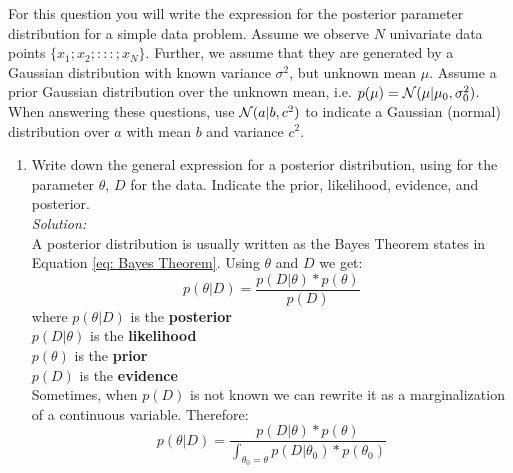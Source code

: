 \documentclass{../amsml}
\begin{document}

\begin{problem} %
For this question you will write the expression for the posterior parameter distribution for a simple data problem. Assume we observe $N$ univariate data points $\{x_1; x_2; : : : ; x_N\}$. Further, we assume that they are generated by a Gaussian distribution with known variance $\sigma^2$, but unknown mean $\mu$. Assume a prior Gaussian distribution over the unknown mean, i.e. $p(\mu) = \mathcal{N}(\mu | \mu_0 , \sigma_0^2)$. When answering these questions, use $\mathcal{N}(a | b, c^2)$ to indicate a Gaussian (normal) distribution over $a$ with mean $b$ and variance $c^2$.

\begin{enumerate}
	\item Write down the general expression for a posterior distribution, using  for the parameter $\theta$, $D$ for the data. Indicate the prior, likelihood, evidence, and posterior. \\
		\emph{Solution: }  \\
			A posterior distribution is usually written as the Bayes Theorem states in Equation \ref{eq: Bayes Theorem}. Using $\theta$ and $D$ we get:
			\begin{equation} \label{eq: posteriorDist}
			p( \theta | D ) = \frac{p( D | \theta ) * p( \theta)}{p(D)}
			\end{equation}
			where 
				$p( \theta | D )$ is the \textbf{posterior} \\
				$p( D | \theta )$ is the \textbf{likelihood} \\ 
				$p( \theta)$ is the \textbf{prior} \\
				$p(D)$ is the \textbf{evidence} \\ 
			Sometimes, when $p(D)$ is not known we can rewrite it as a marginalization of a continuous variable. Therefore:
			\begin{equation} \label{eq: contPosteriorDist}
			p( \theta | D ) = \frac{p( D | \theta ) * p( \theta)}{\int_{\theta_0 = \theta } p(D | \theta_0) * p(\theta_0)}
			\end{equation}


\end{enumerate}
\end{problem}
\end{document}
